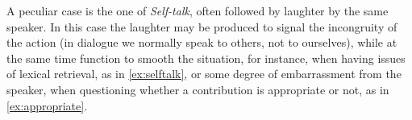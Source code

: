\documentclass[11pt,a4paper]{article}
\begin{document}
A peculiar case is the one of \emph{Self-talk}, often followed by
laughter by the same speaker. In this case the laughter may be
produced to signal the incongruity of the action (in dialogue we
normally speak to others, not to ourselves), while at the same time
function to smooth the situation, for instance, when having issues of
lexical retrieval, as in \ref{ex:selftalk}, or some degree of
embarrassment from the speaker, when questioning whether a
contribution is appropriate or not, as in
\ref{ex:appropriate}.



\begin{lingex}
\item\label{ex:selftalk}
  \small

\item\label{ex:appropriate}
  \small
\end{lingex}




\end{document}
